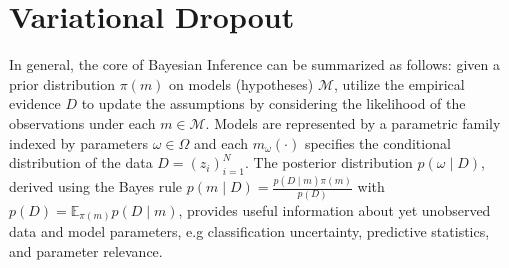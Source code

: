 \documentclass[a4paper,10pt,onecolumn]{article}
\begin{document}


\section{Variational Dropout} %
\label{sec:variational_dropout}

In general, the core of Bayesian Inference can be summarized as follows: given a prior
distribution $\pi(m)$ on models (hypotheses) $\mathcal{M}$, utilize the empirical evidence
$D$ to update the assumptions by considering the likelihood of the observations under each
$m \in \mathcal{M}$. Models are represented by a parametric family indexed by parameters
$\omega \in \Omega$ and each $m_\omega(\cdot)$ specifies the conditional distribution of
the data $
  D = (z_i)_{i=1}^N
$. The posterior distribution $p(\omega \mid D)$, derived using the Bayes rule $
  p(m \mid D) = \tfrac{p(D \mid m) \pi(m)}{p(D)}
$ with $
  p(D) = \mathbb{E}_{\pi(m)} p(D \mid m)
$, provides useful information about yet unobserved data and model parameters, e.g
classification uncertainty, predictive statistics, and parameter relevance.
\end{document}
